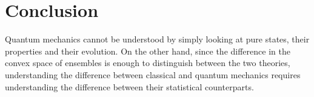 \documentclass{techbrief}
\begin{document}
\section{Conclusion}

Quantum mechanics cannot be understood by simply looking at pure states, their properties and their evolution. On the other hand, since the difference in the convex space of ensembles is enough to distinguish between the two theories, understanding the difference between classical and quantum mechanics requires understanding the difference between their statistical counterparts.
\end{document}

